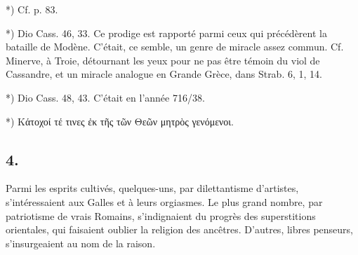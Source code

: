 \documentclass[a4paper, 11pt, oneside, polutonikogreek, french]{article}
\begin{document}
*) Cf. p. 83.

*) Dio Cass. 46, 33. Ce prodige est rapporté parmi ceux qui précédèrent la bataille de Modène. C'était, ce semble, un genre de miracle assez commun. Cf. Minerve, à Troie, détournant les yeux pour ne pas être témoin du viol de Cassandre, et un miracle analogue en Grande Grèce, dans Strab. 6, 1, 14.

*) Dio Cass. 48, 43. C'était en l'année 716/38.

*) Κάτοχοί τέ τινες ἐκ  τῆς τῶν Θεῶν μητρὸς γενόμενοι.

\subsection{4.}

Parmi les esprits cultivés, quelques-uns, par dilettantisme d'artistes, s'intéressaient aux Galles et à leurs orgiasmes. Le plus grand nombre, par patriotisme de vrais Romains, s'indignaient du progrès des superstitions orientales, qui faisaient oublier la religion des ancêtres. D'autres, libres penseurs, s'insurgeaient au nom de la raison.
\end{document}
